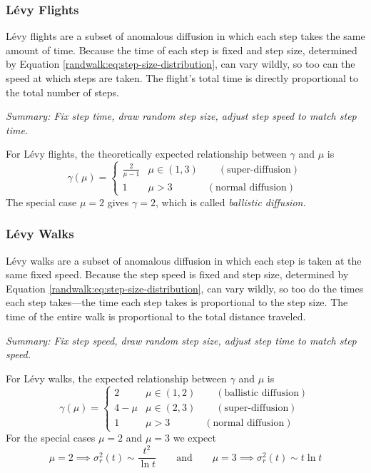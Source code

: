 \documentclass[11pt, a4paper]{article}
\newcommand{\eqtext}[1]{\qquad \text{#1} \qquad}
\newcommand{\lev}{L\'evy\xspace}
\begin{document}
\subsubsection{\lev Flights}
\lev flights are a subset of anomalous diffusion in which each step takes the same amount of time. Because the time of each step is fixed and step size, determined by Equation \ref{randwalk:eq:step-size-distribution}, can vary wildly, so too can the speed at which steps are taken. The flight's total time is directly proportional to the total number of steps.

\vspace{2mm}
\textit{Summary: Fix step time, draw random step size, adjust step speed to match step time.}
\vspace{2mm}


For \lev flights, the theoretically expected relationship between $ \gamma $ and $ \mu $ is
\begin{equation}
	\gamma(\mu) = 
	\begin{cases}
		\frac{2}{\mu - 1} & \mu \in (1, 3) \qquad (\text{super-diffusion})\\
		1 & \mu > 3 \qquad \quad \ \ (\text{normal diffusion})
	\end{cases} \label{randwalk:eq:flight-gamma}
\end{equation}
The special case $ \mu = 2 $ gives $ \gamma = 2 $, which is called \textit{ballistic diffusion.}

\subsubsection{\lev Walks}
\lev walks are a subset of anomalous diffusion in which each step is taken at the same fixed speed. Because the step speed is fixed and step size, determined by Equation \ref{randwalk:eq:step-size-distribution}, can vary wildly, so too do the times each step takes---the time each step takes is proportional to the step size. The time of the entire walk is proportional to the total distance traveled.

\vspace{2mm}
\textit{Summary: Fix step speed, draw random step size, adjust step time to match step speed.}
\vspace{2mm}



For \lev walks, the expected relationship between $ \gamma $ and $ \mu $ is
\begin{equation}
	\gamma(\mu) = 
	\begin{cases}
		2 & \mu \in (1, 2) \qquad (\text{ballistic diffusion})\\
		4 - \mu & \mu \in (2, 3) \qquad (\text{super-diffusion})\\
		1 & \mu > 3 \qquad \quad \ \ (\text{normal diffusion})
	\end{cases} \label{randwalk:eq:walk-gamma}
\end{equation}
For the special cases $ \mu = 2 $ and $ \mu = 3 $ we expect
\begin{equation*}
	\mu = 2 \implies \sigma_{r}^{2}(t) \sim \frac{t^{2}}{\ln t} \eqtext{and} \mu = 3 \implies \sigma_{r}^{2}(t) \sim t \ln t
\end{equation*}
\end{document}

